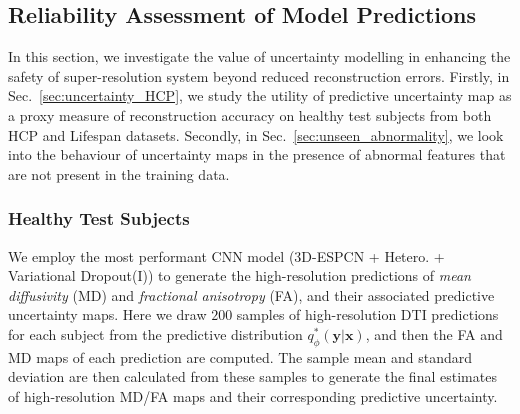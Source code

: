 \subsection{Reliability Assessment of Model Predictions}
 In this section, we investigate the value of uncertainty modelling in enhancing the safety of super-resolution system beyond reduced reconstruction errors. Firstly, in Sec.~\ref{sec:uncertainty_HCP}, we study the utility of predictive uncertainty map as a proxy measure of reconstruction accuracy on healthy test subjects from both HCP and Lifespan datasets. Secondly, in Sec.~\ref{sec:unseen_abnormality}, we look into the behaviour of uncertainty maps in the presence of abnormal features that are not present in the training data. 



\subsubsection*{Healthy Test Subjects} \label{sec:uncertainty_HCP}
We employ the most performant CNN model (3D-ESPCN + Hetero. + Variational Dropout(I)) to generate the high-resolution predictions of \textit{mean diffusivity} (MD) and \textit{fractional anisotropy} (FA), and their associated predictive uncertainty maps.  Here we draw $200$ samples of high-resolution DTI predictions for each subject from the predictive distribution $q_\phi^*(\mathbf{y}|\mathbf{x})$, and then the FA and MD maps of each prediction are computed. The sample mean and standard deviation are then calculated from these samples to generate the final estimates of high-resolution MD/FA maps and their corresponding predictive uncertainty. 

